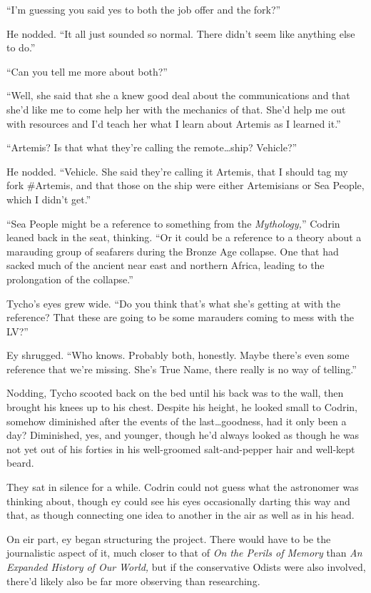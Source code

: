 ``I'm guessing you said yes to both the job offer and the fork?''

He nodded. ``It all just sounded so normal. There didn't seem like anything else to do.''

``Can you tell me more about both?''

``Well, she said that she a knew good deal about the communications and that she'd like me to come help her with the mechanics of that. She'd help me out with resources and I'd teach her what I learn about Artemis as I learned it.''

``Artemis? Is that what they're calling the remote\ldots ship? Vehicle?''

He nodded. ``Vehicle. She said they're calling it Artemis, that I should tag my fork \#Artemis, and that those on the ship were either Artemisians or Sea People, which I didn't get.''

``Sea People might be a reference to something from the \emph{Mythology,}'' Codrin leaned back in the seat, thinking. ``Or it could be a reference to a theory about a marauding group of seafarers during the Bronze Age collapse. One that had sacked much of the ancient near east and northern Africa, leading to the prolongation of the collapse.''

Tycho's eyes grew wide. ``Do you think that's what she's getting at with the reference? That these are going to be some marauders coming to mess with the LV?''

Ey shrugged. ``Who knows. Probably both, honestly. Maybe there's even some reference that we're missing. She's True Name, there really is no way of telling.''

Nodding, Tycho scooted back on the bed until his back was to the wall, then brought his knees up to his chest. Despite his height, he looked small to Codrin, somehow diminished after the events of the last\ldots goodness, had it only been a day? Diminished, yes, and younger, though he'd always looked as though he was not yet out of his forties in his well-groomed salt-and-pepper hair and well-kept beard.

They sat in silence for a while. Codrin could not guess what the astronomer was thinking about, though ey could see his eyes occasionally darting this way and that, as though connecting one idea to another in the air as well as in his head.

On eir part, ey began structuring the project. There would have to be the journalistic aspect of it, much closer to that of \emph{On the Perils of Memory} than \emph{An Expanded History of Our World,} but if the conservative Odists were also involved, there'd likely also be far more observing than researching.

